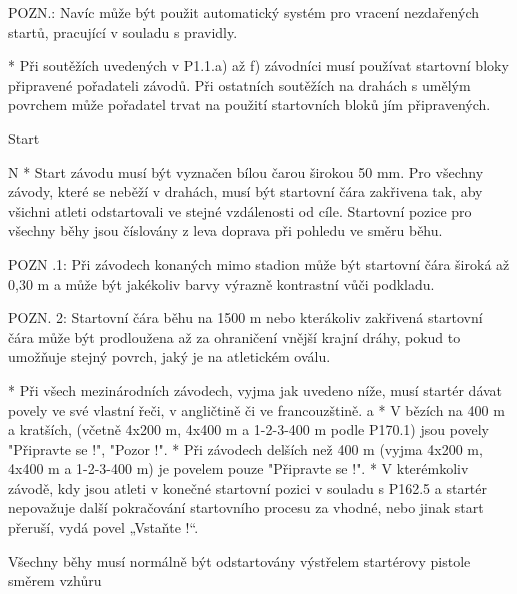 POZN.: Navíc může být použit automatický systém pro vracení nezdařených startů, pracující v souladu s pravidly.

* Při soutěžích uvedených v P1.1.a) až f) závodníci musí používat startovní bloky připravené pořadateli závodů. Při ostatních soutěžích na drahách s umělým povrchem může pořadatel trvat na použití startovních bloků jím připravených.
\enditems

\secc Start

\begitems \style N
* Start závodu musí být vyznačen bílou čarou širokou 50 mm. Pro všechny závody, které se neběží v drahách, musí být startovní čára zakřivena tak, aby všichni atleti odstartovali ve stejné vzdálenosti od cíle. Startovní pozice pro všechny běhy jsou číslovány z leva doprava při pohledu ve směru běhu.

POZN .1: Při závodech konaných mimo stadion může být startovní čára široká až 0,30 m a může být jakékoliv barvy výrazně kontrastní vůči podkladu.

POZN. 2: Startovní čára běhu na 1500 m nebo kterákoliv zakřivená startovní čára může být prodloužena až za ohraničení vnější krajní dráhy, pokud to umožňuje stejný povrch, jaký je na atletickém oválu.

* Při všech mezinárodních závodech, vyjma jak uvedeno níže, musí startér dávat povely ve své vlastní řeči, v angličtině či ve francouzštině.
  \begitems \style a
  * V bězích na 400 m a kratších, (včetně 4x200 m, 4x400 m a 1-2-3-400 m podle P170.1) jsou povely "Připravte se !",  "Pozor !".
  * Při závodech delších než 400 m (vyjma  4x200 m, 4x400 m a 1-2-3-400 m) je povelem pouze "Připravte se !".
  * V kterémkoliv závodě, kdy jsou atleti v konečné startovní pozici v souladu s P162.5 a startér nepovažuje další pokračování startovního procesu za vhodné, nebo jinak start přeruší, vydá povel „Vstaňte !“.

  Všechny běhy musí normálně být odstartovány výstřelem startérovy pistole směrem vzhůru

